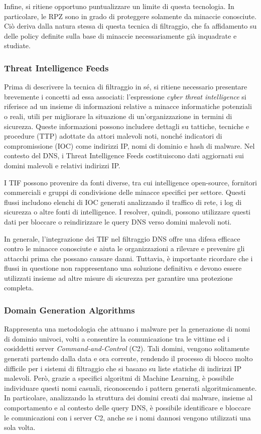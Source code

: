 Infine, si ritiene opportuno puntualizzare un limite di questa tecnologia. In particolare, le RPZ sono in grado di proteggere solamente da minaccie conosciute. Ciò deriva dalla natura stessa di questa tecnica di filtraggio, che fa affidamento su delle policy definite sulla base di minaccie necessariamente già inquadrate e studiate.

\subsubsection{Threat Intelligence Feeds}
Prima di descrivere la tecnica di filtraggio in sé, si ritiene necessario presentare brevemente i concetti ad essa associati: l'espressione \textit{cyber threat intelligence} si riferisce ad un insieme di informazioni relative a minacce informatiche potenziali o reali, utili per migliorare la situazione di un'organizzazione in termini di sicurezza.
%
Queste informazioni possono includere dettagli su tattiche, tecniche e procedure (TTP) adottate da attori malevoli noti, nonché indicatori di compromissione (IOC) come indirizzi IP, nomi di dominio e hash di malware. Nel contesto del DNS, i Threat Intelligence Feeds costituiscono dati aggiornati sui domini malevoli e relativi indirizzi IP.

I TIF possono provenire da fonti diverse, tra cui intelligence open-source, fornitori commerciali e gruppi di condivisione delle minacce specifici per settore. Questi flussi includono elenchi di IOC generati analizzando il traffico di rete, i log di sicurezza o altre fonti di intelligence. I resolver, quindi, possono utilizzare questi dati per bloccare o reindirizzare le query DNS verso domini malevoli noti.

In generale, l'integrazione dei TIF nel filtraggio DNS offre una difesa efficace contro le minacce conosciute e aiuta le organizzazioni a rilevare e prevenire gli attacchi prima che possano causare danni. Tuttavia, è importante ricordare che i flussi in questione non rappresentano una soluzione definitiva e devono essere utilizzati insieme ad altre misure di sicurezza per garantire una protezione completa.

\subsubsection{Domain Generation Algorithms}
Rappresenta una metodologia che attuano i malware per la generazione di nomi di dominio univoci, volti a consentire la comunicazione tra le vittime ed i cosiddetti server \textit{Command-and-Control} (C2). Tali domini, vengono solitamente generati partendo dalla data e ora corrente, rendendo il processo di blocco molto difficile per i  sistemi di filtraggio che si basano su liste statiche di indirizzi IP malevoli. Però, grazie a specifici algoritmi di Machine Learning, è possibile individuare questi nomi casuali, riconoscendo i pattern generati algoritmicamente. In particolare, analizzando la struttura dei domini creati dai malware, insieme al comportamento e al contesto delle query DNS, è possibile identificare e bloccare le comunicazioni con i server C2, anche se i nomi dannosi vengono utilizzati una sola volta.


